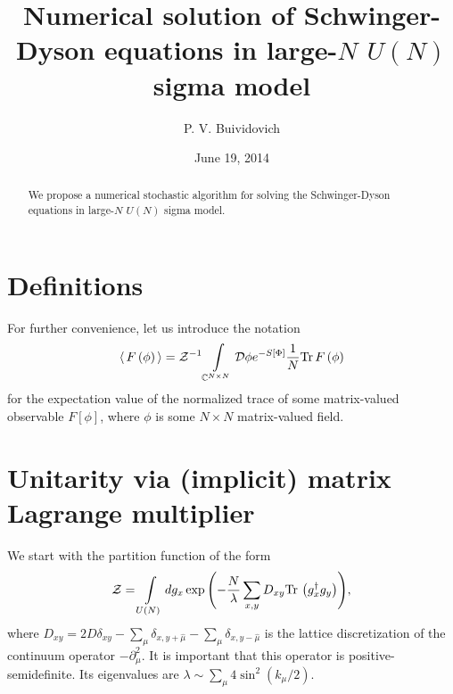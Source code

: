 \documentclass[twocolumn,showpacs,preprintnumbers,superscriptaddress,amsmath,floatfix,amssymb,secnumarabic]{revtex4}
\newcommand{\lr}[1]{ \left( #1 \right) }
\newcommand{\lrs}[1]{ \left[ #1 \right] }
\newcommand{\vev}[1]{ \langle \, #1 \, \rangle }
\newcommand{\tr}{ {\rm Tr} \, }
\newcommand{\expa}[1]{ \exp{\left( #1 \right)} }
\begin{document}
\sloppy

\title{Numerical solution of Schwinger-Dyson equations in large-$N$ $U\lr{N}$ sigma model}

\author{P. V. Buividovich}

\date{June 19, 2014}
\begin{abstract}
 We propose a numerical stochastic algorithm for solving the Schwinger-Dyson equations in large-$N$ $U\lr{N}$ sigma model.
\end{abstract}

\maketitle

\section*{Definitions}

For further convenience, let us introduce the notation
\begin{eqnarray}
\label{vev_definition}
 \vev{F\lr{\phi}} = \mathcal{Z}^{-1} \int\limits_{\mathbb{C}^{N \times N}} \mathcal{D}\phi e^{-S\lrs{\Phi}} \frac{1}{N} \tr F\lr{\phi}
\end{eqnarray}
for the expectation value of the normalized trace of some matrix-valued observable $F\lrs{\phi}$, where $\phi$ is some $N \times N$ matrix-valued field.

\section*{Unitarity via (implicit) matrix Lagrange multiplier}

 We start with the partition function of the form
\begin{eqnarray}
\label{sm_partition}
 \mathcal{Z} = \int\limits_{U\lr{N}} dg_x \expa{-\frac{N}{\lambda} \sum\limits_{x,y} D_{xy} \tr\lr{g^{\dag}_x g_y} } ,
\end{eqnarray}
where $D_{xy} = 2 D \delta_{x y} - \sum\limits_{\mu} \delta_{x,y+\hat{\mu}} - \sum\limits_{\mu} \delta_{x,y-\hat{\mu}}$ is the lattice discretization of the continuum operator $-\partial_{\mu}^2$. It is important that this operator is positive-semidefinite. Its eigenvalues are $\lambda \sim \sum\limits_{\mu} 4 \sin^2\lr{k_{\mu}/2}$.
\end{document}
